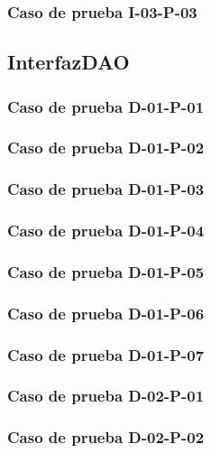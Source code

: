 \documentclass[10pt,a4paper]{article}
\begin{document}
			\subsubsection{Caso de prueba I-03-P-03}

	\subsection{InterfazDAO}
			\subsubsection{Caso de prueba D-01-P-01}

			\subsubsection{Caso de prueba D-01-P-02}

			\subsubsection{Caso de prueba D-01-P-03}

			\subsubsection{Caso de prueba D-01-P-04}

			\subsubsection{Caso de prueba D-01-P-05}

			\subsubsection{Caso de prueba D-01-P-06}

			\subsubsection{Caso de prueba D-01-P-07}

			\subsubsection{Caso de prueba D-02-P-01}

			\subsubsection{Caso de prueba D-02-P-02}
\end{document}
